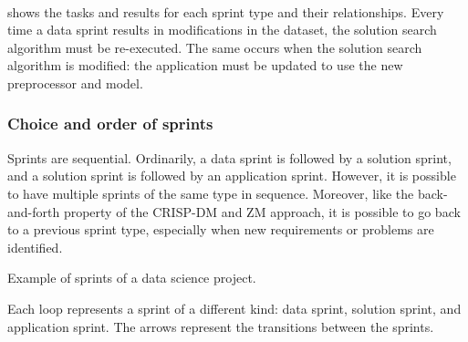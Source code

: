\paragraph{}
 shows the tasks and results for each sprint type and their
relationships.  Every time a data sprint results in modifications in the dataset, the
solution search algorithm must be re-executed.  The same occurs when the solution search
algorithm is modified: the application must be updated to use the new preprocessor
and model.

\subsubsection{Choice and order of sprints}

Sprints are sequential.  Ordinarily, a data sprint is followed by a solution sprint, and a
solution sprint is followed by an application sprint.  However, it is possible to have
multiple sprints of the same type in sequence.  Moreover, like the back-and-forth property of the CRISP-DM
and ZM approach, it is possible to go back to a previous sprint type, especially
when new requirements or problems are identified.

\begin{figurebox}[label=fig:sprints]{Example of sprints of a data science project.}
  \centering
  \tcblower
  Each loop represents a sprint of a different kind: data sprint, solution sprint, and
  application sprint.  The arrows represent the transitions between the sprints.
\end{figurebox}

